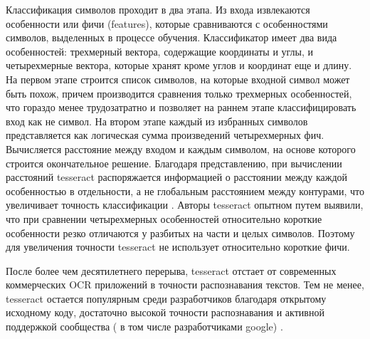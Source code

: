 \documentclass[oneside,final,14pt]{extreport}
\begin{document}
Классификация символов проходит в два этапа. Из входа извлекаются особенности или фичи (features), которые сравниваются с особенностями символов, выделенных в процессе обучения. Классификатор имеет два вида особенностей: трехмерный вектора, содержащие координаты и углы, и четырехмерные вектора, которые хранят кроме углов и координат еще и длину. На первом этапе строится список символов, на которые входной символ может быть похож, причем производится сравнения только трехмерных особенностей, что гораздо менее трудозатратно и позволяет  на раннем этапе классифицировать вход как не символ. На втором этапе каждый из избранных символов представляется как логическая сумма произведений четырехмерных фич. Вычисляется расстояние между входом и каждым символом, на основе которого строится окончательное решение. Благодаря представлению, при вычислении расстояний tesseract распоряжается информацией о расстоянии между каждой особенностью в отдельности, а не глобальным расстоянием между контурами, что увеличивает точность классификации .  Авторы tesseract опытном путем выявили, что при сравнении четырехмерных особенностей относительно короткие особенности резко отличаются у разбитых на части и целых символов. Поэтому для увеличения точности tesseract не использует относительно короткие фичи. 

После более чем десятилетнего перерыва, tesseract отстает от современных коммерческих OCR приложений в точности распознавания текстов. Тем не менее, tesseract остается популярным среди разработчиков благодаря открытому исходному коду, достаточно высокой точности распознавания и активной поддержкой сообщества ( в том числе разработчиками google) . 
\end{document}
